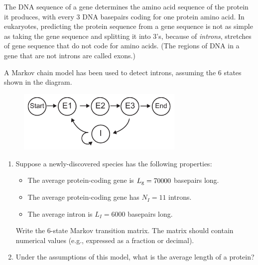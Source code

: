 \documentclass[12pt,letterpaper]{article}
\begin{document}


The DNA sequence of a gene determines the amino acid sequence of the protein it produces, with every 3 DNA basepairs coding for one protein amino acid. In eukaryotes, predicting the protein sequence from a gene sequence is not as simple as taking the gene sequence and splitting it into 3's, because of \emph{introns}, stretches of gene sequence that do not code for amino acids. (The regions of DNA in a gene that are not introns are called exons.)

A Markov chain model has been used to detect introns, assuming the 6 states shown in the diagram.
\begin{figure}[h!]
\centering\includegraphics[width=8cm]{figP21}
\end{figure}

\begin{enumerate}[i]
\item Suppose a newly-discovered species has the following properties:
\begin{itemize}
\item The average protein-coding gene is $L_{\rm g} = 70000$ basepairs long.
\item The average protein-coding gene has $N_I=11$ introns.
\item The average intron is $L_I=6000$ basepairs long. 
\end{itemize}
Write the 6-state Markov transition matrix. The matrix should contain numerical values (e.g., expressed as a fraction or decimal). 
\item Under the assumptions of this model, what is the average length of a protein?
\end{enumerate}

\end{document}
